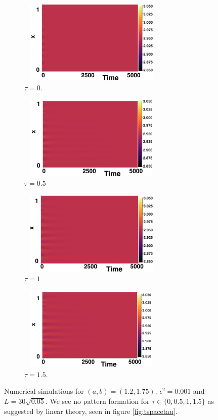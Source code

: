 \begin{figure}[H]
    \centering
    \begin{subfigure}[b]{0.45\textwidth}
        \centering
        \includegraphics[width=7cm,height=4cm]{p3t0.png}
        \caption{$\tau=0$.}
        \label{}
    \end{subfigure}
    \hfill
    \begin{subfigure}[b]{0.45\textwidth}
        \centering
        \includegraphics[width=7cm,height=4cm]{p3t05.png}
        \caption{$\tau=0.5$}
        \label{}
    \end{subfigure}
    \hfill
    \begin{subfigure}[b]{0.45\textwidth}
        \centering
        \includegraphics[width=7cm,height=4cm]{p3t1.png}
        \caption{$\tau=1$}
        \label{}
    \end{subfigure}
    \hfill
    \begin{subfigure}[b]{0.45\textwidth}
        \centering
        \includegraphics[width=7cm,height=4cm]{p3t15.png}
        \caption{$\tau=1.5$.}
        \label{}
    \end{subfigure}
    \caption{Numerical simulations for $(a,b)=(1.2,1.75)$. $\epsilon^2=0.001$ and $L=30\sqrt{0.05}$.  We see no pattern formation for $\tau\in\{0,0.5,1,1.5\}$ as suggested by linear theory, seen in figure \ref{fig:tspacetau}.}
    \label{fig:testturing2}
\end{figure}


